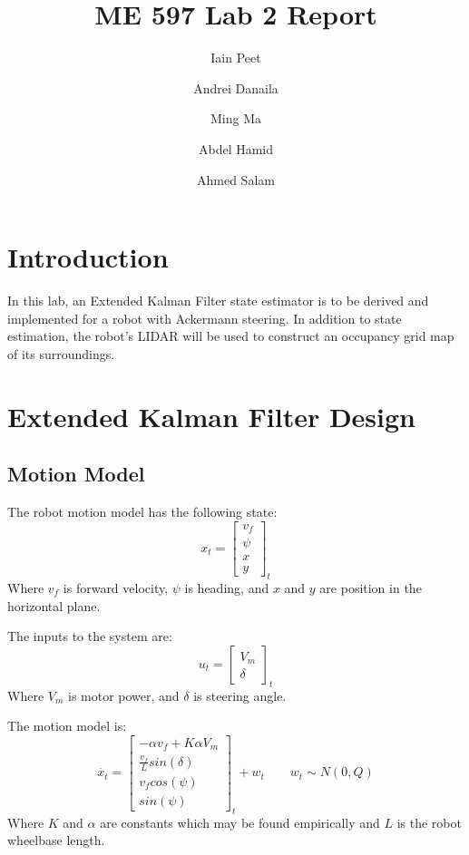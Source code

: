 \documentclass[11pt]{article} %
\title{ME 597 Lab 2 Report}
\author{Iain Peet \and Andrei Danaila \and Ming Ma \and Abdel Hamid \and Ahmed Salam}
\begin{document}
\maketitle

\clearpage

\section{Introduction}

In this lab, an Extended Kalman Filter state estimator is to be derived and implemented for a robot with Ackermann steering.  In addition to state estimation, the robot's LIDAR will be used to construct an occupancy grid map of its surroundings.

\section{Extended Kalman Filter Design}

\subsection{Motion Model}
The robot motion model has the following state:
\begin{equation}
x_t = 
\left[ \begin{array}{c}
v_f \\
\psi \\
x \\
y
\end{array} \right] _t
\end{equation}
Where $v_f$ is forward velocity, $\psi$ is heading, and $x$ and $y$ are position in the horizontal plane.  

The inputs to the system are:
\begin{equation}
u_t =
\left[ \begin{array}{c}
V_m \\
\delta
\end{array} \right] _t
\end{equation}
Where $V_m$ is motor power, and $\delta$ is steering angle.

The motion model is:
\begin{equation}
\dot{x_t} = \left[ \begin{array}{c} 
-\alpha v_f + K \alpha V_m \\
\frac{v_f}{L} sin(\delta) \\
v_f cos( \psi ) \\
 sin( \psi )
\end{array} \right] _t + w_t \quad \quad w_t \sim N(0, Q)
\label{motion}
\end{equation}
Where  $K$ and $\alpha$ are constants which may be found empirically and $L$ is the robot wheelbase length.
\end{document}
